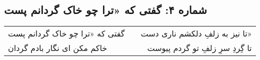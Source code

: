 \begin{center}
\section*{شماره ۴: گفتی که «ترا چو خاک گردانم پست}
\label{sec:004}
\begin{longtable}{l p{0.5cm} r}
گفتی که «ترا چو خاک گردانم پست
&&
تا نیز به زلفِ دلکشم ناری دست»
\\
خاکم مکن ای نگار بادم گردان
&&
تا گِردِ سرِ زلفِ تو گردم پیوست
\\
\end{longtable}
\end{center}
